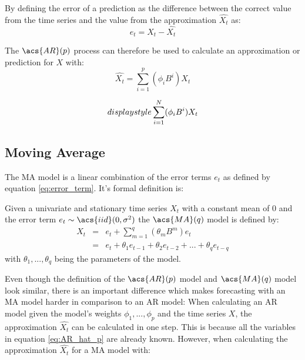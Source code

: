 By defining the error of a prediction as the difference between the correct value from the time series and the value from the approximation \(\hat{X_t}\) as: 
\begin{equation}\label{eq:error_term}
    e_t = X_t - \hat{X_t}
\end{equation}

The $\acs{AR}(p)$ process can therefore be used to calculate an approximation or prediction for $X$ with:
\begin{equation}\label{eq:AR_hat_p}
    \hat{X_t} =\displaystyle\sum_{i=1}^{p} (\phi_i B^i) X_t 
\end{equation}

\begin{equation}\label{eq:crossentropy}
    \\displaystyle\sum_{i=1}^{N} (\phi_i B^i) X_t 
\end{equation}

\subsection*{Moving Average}\label{MA}

The \acl{MA} model is a linear combination of the error terms $e_t$ as defined by equation \ref{eq:error_term}. It's formal definition is:

\begin{definition}\label{def:movingaverage}
    Given a univariate and stationary time series \(X_t\) with a constant mean of 0 and the error term $e_t \sim \acs{iid}(0, \sigma^2) $ the $\acs{MA}(q)$ model is defined by:\textsuperscript{\cite[p.~50]{Brockwell2002Introduction2nd}}
    \begin{equation}\label{eq:MA_q}
        \begin{array}{lcl}
            X_t &=& e_t + \displaystyle\sum_{m=1}^{q} (\theta_m B^m) e_t \\
            &=& e_t + \theta_1 e_{t-1}+ \theta_2 e_{t-2}+ ... + \theta_q e_{t-q}
        \end{array}
    \end{equation}
    with $\theta_1, ..., \theta_q$ being the parameters of the model.
\end{definition}

Even though the definition of the $\acs{AR}(p)$ model and $\acs{MA}(q)$ model look similar, there is an important difference which makes forecasting with an \acl{MA} model harder in comparison to an \acl{AR} model: When calculating an \acs{AR} model given the model's weights $\phi_1, ..., \phi_p$ and the time series $X$, the approximation $\hat{X_t}$ can be calculated in one step. This is because all the variables in equation \ref{eq:AR_hat_p} are already known. However, when calculating the approximation $\hat{X_t}$ for a \acs{MA} model with:

